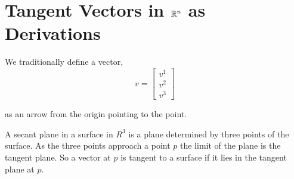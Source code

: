 \section{Tangent Vectors in $\mathbb{R}^{n}$ as Derivations}
We traditionally define a vector, 
\[
  v = \begin{bmatrix}
    v^{1} \\ v^{2} \\ v^{3}
  \end{bmatrix}
\]

as an arrow from the origin pointing to the point.
\vspace{1em}

A secant plane in a surface in $R^{3}$ is a plane determined by three points of the surface. As the three points approach a point $p$ the limit of the plane is the tangent plane. So a vector at $p$ is tangent to a surface if it lies in the tangent plane at $p$.

